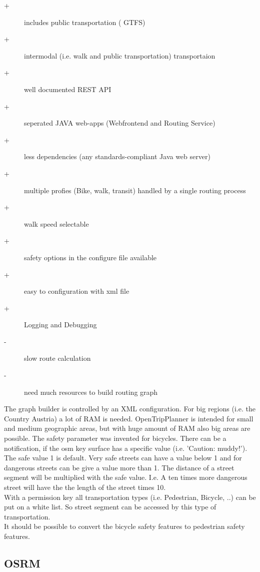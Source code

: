 \documentclass{sig-alternate}
\begin{document}
\begin{description}
  \item[+] includes public transportation ( GTFS)
  \item[+] intermodal (i.e. walk and public transportation) transportaion
  \item[+] well documented REST API
  \item[+] seperated JAVA web-apps (Webfrontend and Routing Service)
  \item[+] less dependencies (any standards-compliant Java web server)
  \item[+] multiple profies (Bike, walk, transit) handled by a single routing process
  \item[+] walk speed selectable
  \item[+] safety options in the configure file available
  \item[+] easy to configuration with xml file
  \item[+] Logging and Debugging 
  \item[-] slow route calculation
  \item[-] need much resources to build routing graph   
\end{description} 
 
 The graph builder is controlled by an XML configuration. For big regions (i.e. the Country Austria) a lot of RAM is needed. OpenTripPlanner is intended for small and medium geographic areas, but with huge amount of RAM also big areas are possible. The safety parameter was invented for bicycles. There can be a notification, if the osm key surface  has a specific value (i.e. 'Caution: muddy!'). The safe value 1 is default. Very safe streets can have a value below 1 and for dangerous streets can be give a value more than 1. The distance of a street segment will be multiplied with the safe value. I.e. A ten times more dangerous street will have the the length of the street times 10. \\
 With a permission key all transportation types (i.e. Pedestrian, Bicycle, ..) can be put on a white list. So street segment can be accessed by this type of transportation. \\
 It should be possible to convert the bicycle safety features to pedestrian safety features.
 



\subsection{OSRM}
\end{document}
